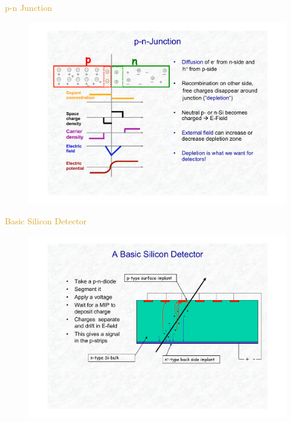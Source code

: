 \begin{frame}{\textcolor{Goldenrod}{p-n Junction}}
  \begin{figure}[h]\centering
    \includegraphics[width=0.95\linewidth]{./Images/104_extra_pn_junction}
  \end{figure}
\end{frame}

\begin{frame}{\textcolor{Goldenrod}{Basic Silicon Detector}}
  \begin{figure}[h]\centering
    \includegraphics[width=0.95\linewidth]{./Images/105_extra_silicon_detector}
  \end{figure}
\end{frame}


